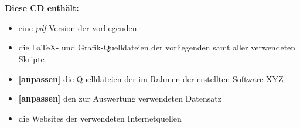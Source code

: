 \chapter*{}
\thispagestyle{empty}

\begin{center}
  \vspace{-3cm}
\end{center}

\vfill

\textbf{Diese CD enthält:}
\begin{itemize}
 \item eine \emph{pdf}-Version der vorliegenden \thesistype{}
 \item die \LaTeX- und Grafik-Quelldateien der vorliegenden \thesistype{} samt aller verwendeten Skripte
 \item \textbf{[anpassen]} die Quelldateien der im Rahmen der \thesistype{} erstellten Software XYZ
 \item \textbf{[anpassen]} den zur Auswertung verwendeten Datensatz
 \item die Websites der verwendeten Internetquellen
\end{itemize}
